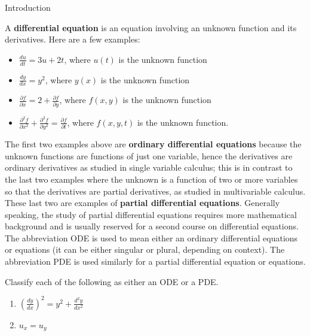 \documentclass[12pt,letterpaper,twoside]{amsart}
\newcounter{example}
\newcounter{exercise}
\newcommand{\exercise}{\bigskip \noindent {\large {\sc Exercise \arabic{exercise}:}} \addtocounter{exercise}{1}}
\begin{document}
\sffamily

\begin{center} {\LARGE Introduction} \end{center}

\setcounter{example}{1}
\setcounter{exercise}{1}

A {\bf differential equation} is an equation involving an unknown function and its derivatives.  Here are a few examples:

\begin{itemize}
\item $\frac{du}{dt} = 3u+2t$, where $u(t)$ is the unknown function
\item $\frac{dy}{dx} = y^2$, where $y(x)$ is the unknown function
\item $\frac{\partial f}{\partial x} = 2 + \frac{\partial f}{\partial y}$, where $f(x,y)$ is the unknown function
\item $\frac{\partial^2 f}{\partial x^2} + \frac{\partial^2 f}{\partial y^2} = \frac{\partial f}{\partial t}$, where $f(x,y,t)$ is the unknown function.
\end{itemize}

The first two examples above are {\bf ordinary differential equations} because the unknown functions are functions of just one variable, hence the derivatives are ordinary derivatives as studied in single variable calculus; this is in contrast to the last two examples where the unknown is a function of two or more variables so that the derivatives are partial derivatives, as studied in multivariable calculus.  These last two are examples of {\bf partial differential equations}.  Generally speaking, the study of partial differential equations requires more mathematical background and is usually reserved for a second course on differential equations.  The abbreviation ODE is used to mean either an ordinary differential equations or equations (it can be either singular or plural, depending on context).  The abbreviation PDE is used similarly for a partial differential equation or equations.

\exercise Classify each of the following as either an ODE or a PDE.
\begin{enumerate}
\item $\left(\frac{dy}{dx} \right)^2 = y^2 + \frac{d^2y}{dx^2} $
\item $u_x=u_y$
\end{enumerate}
\end{document}
